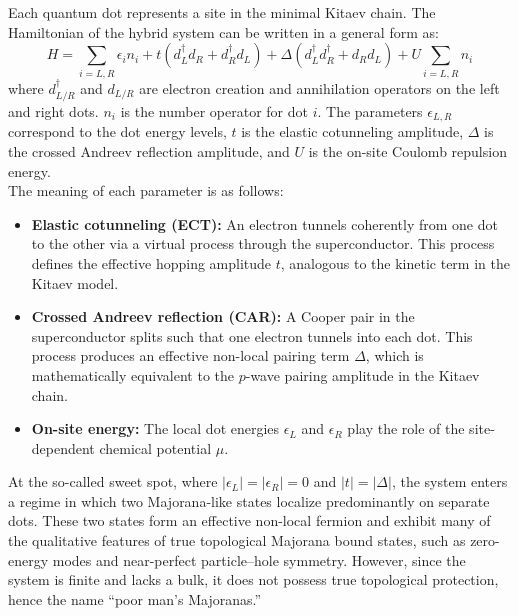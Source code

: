 \documentclass[11pt, letterpaper, titlepage]{article}
\begin{document}
Each quantum dot represents a site in the minimal Kitaev chain. The Hamiltonian of the hybrid system can be written in a general form as:
\begin{equation}
H = \sum_{i=L,R} \epsilon_i n_i
+ t (d_L^\dagger d_R + d_R^\dagger d_L)
+ \Delta (d_L^\dagger d_R^\dagger + d_R d_L)
+ U \sum_{i=L,R} n_i
\label{eq:qdsqdh}
\end{equation}
where $d_{L/R}^\dagger$ and $d_{L/R}$ are electron creation and annihilation operators on the left and right dots. $n_i$ is the number operator for dot $i$. The parameters $ϵ_{L,R}$ correspond to the dot energy levels, $t$ is the elastic cotunneling amplitude, $Δ$ is the crossed Andreev reflection amplitude, and $U$ is the on-site Coulomb repulsion energy.\\
The meaning of each parameter is as follows:
\begin{itemize}
    \item \textbf{Elastic cotunneling (ECT):} An electron tunnels coherently from one dot to the other via a virtual process through the superconductor. This process defines the effective hopping amplitude $t$, analogous to the kinetic term in the Kitaev model.
    \item \textbf{Crossed Andreev reflection (CAR):} A Cooper pair in the superconductor splits such that one electron tunnels into each dot. This process produces an effective non-local pairing term $\Delta$, which is mathematically equivalent to the $p$-wave pairing amplitude in the Kitaev chain.
    \item \textbf{On-site energy:} The local dot energies $\epsilon_L$ and $\epsilon_R$ play the role of the site-dependent chemical potential $\mu$.
\end{itemize}
At the so-called sweet spot, where $|\epsilon_L| = |\epsilon_R| = 0$ and $|t| = |\Delta|$, the system enters a regime in which two Majorana-like states localize predominantly on separate dots. These two states form an effective non-local fermion and exhibit many of the qualitative features of true topological Majorana bound states, such as zero-energy modes and near-perfect particle–hole symmetry. However, since the system is finite and lacks a bulk, it does not possess true topological protection, hence the name “poor man’s Majoranas.”
\end{document}
